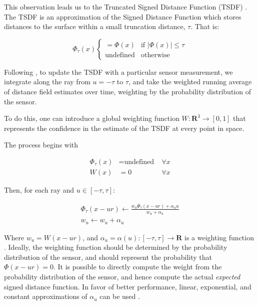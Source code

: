 \documentclass[conference,10pt]{IEEEtran}
\begin{document}
This observation leads us to the Truncated Signed Distance Function (TSDF)
\cite{Curless1996}. The TSDF is an approximation of the  Signed Distance
Function which stores distances to the surface within a small truncation
distance, $\tau$. That is:

$$ \Phi_{\tau}(x) \begin{cases}
	 = \Phi(x) & \text{if } |\Phi(x)| \leq \tau \\ 
	 \text{undefined} & \text{otherwise}
	 \end{cases}
$$

Following \cite{Curless1996}, to update the TSDF with a particular sensor
measurement, we integrate along the ray from $u = -\tau$ to $\tau$, and take the
weighted running average of distance field estimates over time, weighting by the
probability distribution of the sensor.

To do this, one can introduce a global weighting function $W : \mathbf{R}^3 \to
[0, 1]$ that represents the confidence in the estimate of the TSDF at every
point in space.

The process begins with 

\begin{align*}
\Phi_{\tau}(x)& = \text{undefined} \;&\forall x  \\
%
 W(x)&= 0 \; &\forall x 
\end{align*}

Then, for each ray and $u\in[-\tau, \tau]$:

\begin{subequations}
\begin{align}
\Phi_{\tau}(x - ur) \gets \frac{w_u \Phi_{\tau}(x - ur) + \alpha_u u}{w_u
+\alpha_u}
\\
%
w_u \gets w_u+ \alpha _u
\end{align}
\label{eqn:update}
\end{subequations}

\noindent Where  $w_u = W(x - ur)$, and $\alpha_u  = \alpha(u) : [-\tau,\tau]\to
\mathbf{R} $ is a weighting function . Ideally, the weighting function should be
determined by the probability distribution of the sensor, and should represent
the probability that $\Phi(x - ur) = 0$. It is possible \cite{Nguyen2012} to
directly compute the weight from the probability distribution of the
sensor, and hence compute the actual \emph{expected} signed distance function.
In favor of better performance, linear, exponential, and constant
approximations of $\alpha_u$ can be used \cite{Curless1996, Newcombe,
Whelan2013, Bylow2013}.
\end{document}
